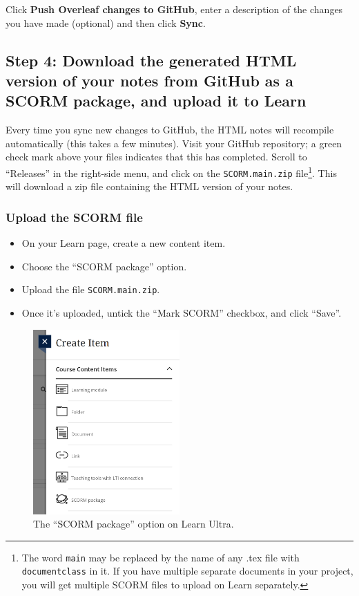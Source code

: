 Click \textbf{Push Overleaf changes to GitHub}, enter a description of the changes you have made (optional) and then click \textbf{Sync}.

\subsection{Step 4: Download the generated HTML version of your notes from GitHub as a SCORM package, and upload it to Learn}
\label{ssec:download}

Every time you sync new changes to GitHub, the HTML notes will recompile automatically (this takes a few minutes). Visit your GitHub repository; a green check mark above your files indicates that this has completed. Scroll to ``Releases'' in the right-side menu, and click on the \texttt{SCORM.main.zip} file\footnote{The word \texttt{main} may be replaced by the name of any .tex file with \texttt{documentclass} in it. If you have multiple separate documents in your project, you will get multiple SCORM files to upload on Learn separately.}. This will download a zip file containing the HTML version of your notes.


\subsubsection{Upload the SCORM file}
\label{ssec:scorm}

\begin{itemize}
    \item On your Learn page, create a new content item.
    \item Choose the ``SCORM package'' option.
    \item Upload the file \verb|SCORM.main.zip|.
    \item Once it's uploaded, untick the ``Mark SCORM'' checkbox, and click ``Save''.
\end{itemize}

\begin{figure}[h!]
    \centering
    \includegraphics[width=0.5\textwidth]{img/scorm.png}
    \caption{The ``SCORM package'' option on Learn Ultra.}
    \label{fig:scorm}
\end{figure}


